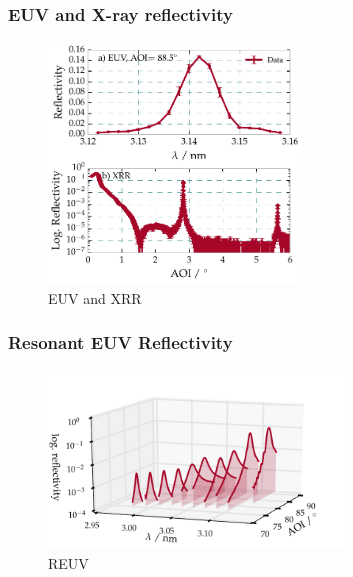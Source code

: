 \subsubsection{EUV and X-ray reflectivity}
\begin{figure}[htbp]
  \centering
  \includegraphics[width=0.6\textwidth]{img/CrSc_EUV_XRR_data}
  \caption{EUV and XRR}
  \label{ch_spec:fig_CrSc_EUV_XRR_data}
\end{figure}
\subsubsection{Resonant EUV Reflectivity}
\begin{figure}[htbp]
  \centering
  \includegraphics[width=0.7\textwidth]{img/CrSc_REUV_data}
  \caption{REUV}
  \label{ch_spec:fig_CrSc_REUV_data}
\end{figure}
